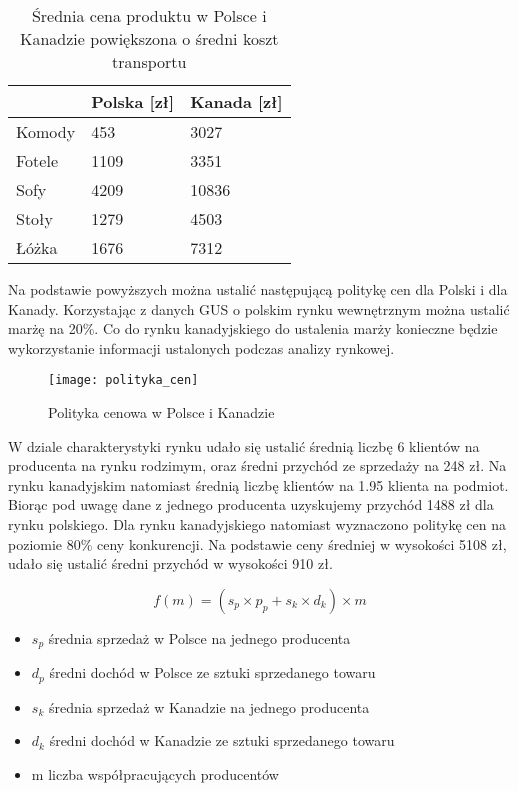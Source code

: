 		\begin{table}[H]
		\centering
		\begin{tabular}{|l|l|l|}
		\hline
					& Polska [zł]& Kanada [zł]\\ \hline
		Komody 	& 453  & 3027 \\ \hline
		Fotele 	& 1109 & 3351 \\ \hline
		Sofy   	& 4209 & 10836 \\ \hline
		Stoły  	& 1279 & 4503 \\ \hline
		Łóżka  	& 1676 & 7312 \\ \hline
		\end{tabular}
		\caption{Średnia cena produktu w Polsce i Kanadzie powiększona o średni koszt transportu}
		\label{avg_price_pl_ca}
		\end{table}

		Na podstawie powyższych można ustalić  następującą politykę cen dla Polski i dla Kanady. Korzystając z danych GUS o polskim rynku wewnętrznym można ustalić marżę na 20\%. Co do rynku kanadyjskiego do ustalenia marży konieczne będzie wykorzystanie informacji ustalonych podczas analizy rynkowej.
		
		\begin{figure}[H]
			\centering
			\texttt{[image: polityka\_cen]}
			\caption{Polityka cenowa w Polsce i Kanadzie}
			\label{polityka_cen}
		\end{figure}

		W dziale charakterystyki rynku udało się ustalić średnią liczbę 6 klientów na producenta na rynku rodzimym, oraz średni przychód ze sprzedaży na 248 zł. Na rynku kanadyjskim natomiast średnią liczbę klientów na 1.95 klienta na podmiot. Biorąc pod uwagę dane z jednego producenta uzyskujemy przychód 1488 zł dla rynku polskiego. Dla rynku kanadyjskiego natomiast wyznaczono politykę cen na poziomie 80\% ceny konkurencji. Na podstawie ceny średniej w wysokości 5108 zł, udało się ustalić średni przychód w wysokości 910 zł. 

		\[ f(m) = (s_p \times p_p + s_k \times d_k ) \times m \]
		
		\begin{itemize}
			\item{\( s_p \)} średnia sprzedaż w Polsce na jednego producenta
			\item{\( d_p \)} średni dochód w Polsce ze sztuki sprzedanego towaru
			\item{\( s_k \)} średnia sprzedaż w Kanadzie na jednego producenta
			\item{\( d_k \)} średni dochód w Kanadzie ze sztuki sprzedanego towaru
			\item{m} liczba współpracujących producentów
		\end{itemize}
		
